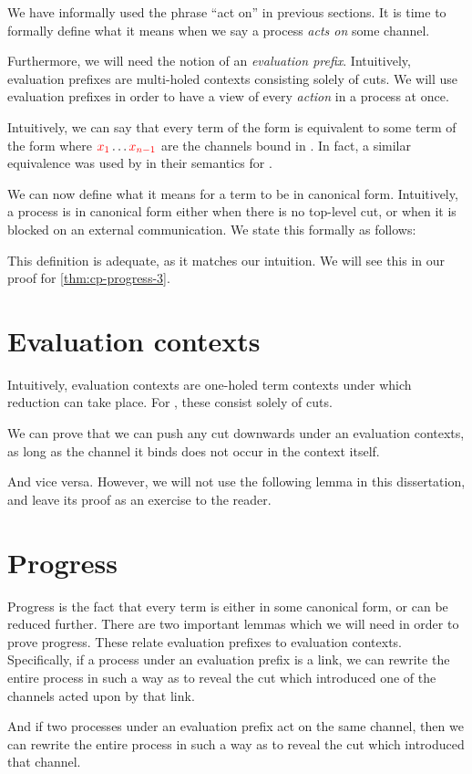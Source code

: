 We have informally used the phrase ``act on'' in previous sections. It is time
to formally define what it means when we say a process \emph{acts on} some
channel.

Furthermore, we will need the notion of an \emph{evaluation prefix}.
Intuitively, evaluation prefixes are multi-holed contexts consisting solely of
cuts. We will use evaluation prefixes in order to have a view of every
\emph{action} in a process at once.

Intuitively, we can say that every term of the form
 is equivalent to some term of the form
where $\textcolor{red}{x_1} \dots \textcolor{red}{x_{n-1}}$ are the channels bound in .
In fact, a similar equivalence was used by \citeauthor{lindley2015semantics}
\cite{lindley2015semantics} in their semantics for \cp. 

We can now define what it means for a term to be in canonical form. Intuitively,
a process is in canonical form either when there is no top-level cut, or when it
is blocked on an external communication. We state this formally as follows:

This definition is adequate, as it matches our intuition. We will see this in
our proof for \cref{thm:cp-progress-3}.

\section{Evaluation contexts}\label{sec:cp-evaluation-contexts}
Intuitively, evaluation contexts are one-holed term contexts under which
reduction can take place. For \rcp, these consist solely of cuts.

We can prove that we can push any cut downwards under an evaluation contexts, as
long as the channel it binds does not occur in the context itself.

And vice versa. However, we will not use the following lemma in this
dissertation, and leave its proof as an exercise to the reader.


\section{Progress}\label{sec:cp-progress}
Progress is the fact that every term is either in some canonical form, or can be
reduced further.
%
There are two important lemmas which we will need in order to prove progress.
These relate evaluation prefixes to evaluation contexts.
%
Specifically, if a process under an evaluation prefix is a link, we can rewrite
the entire process in such a way as to reveal the cut which introduced one of
the channels acted upon by that link.

And if two processes under an evaluation prefix act on the same channel, then we
can rewrite the entire process in such a way as to reveal the cut which
introduced that channel. 


